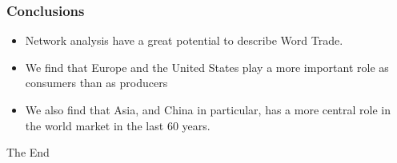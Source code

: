 \documentclass[professionalfont,fleqn]{beamer}
\begin{document}
		\begin{frame}
		\frametitle{Conclusions}
		\begin{itemize}
			\item Network analysis have a great potential to describe Word Trade.
			\item We find that Europe and the United States play a more important role as consumers than as producers
			\item We also find that Asia, and China in particular, has a more central role in the world market in the last 60 years.
		\end{itemize}
		\end{frame}
	
		
		\begin{frame}
		\Huge{\centerline{The End}}
		\end{frame}
		
		
		
\end{document}
